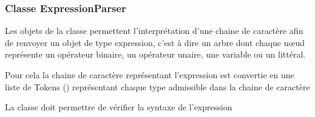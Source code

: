 \subsubsection{Classe ExpressionParser}

Les objets de la classe   permettent l'interprétation d'une chaine de caractère afin de renvoyer un objet de type expression, c'est à dire un arbre dont chaque n\oe ud représente un opérateur binaire, un opérateur unaire, une variable ou un littéral.

Pour cela la chaine de caractère représentant l'expression est convertie en une liste de Tokens () représentant chaque type admissible dans la chaine de caractère

La classe doit permettre de vérifier la syntaxe de l'expression 
